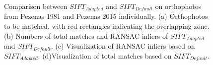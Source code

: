 \begin{figure}[htbp]
\begin{center}
{\begin{minipage}[t]{0.48\linewidth}
			\end{minipage}%
		}
		\caption{Comparison between $SIFT_{Adapted}$ and $SIFT_{Default}$ on orthophotos from Pezenas 1981 and Pezenas 2015 individually. (a) Orthophotos to be matched, with red rectangles indicating the overlapping zone. (b) Numbers of total matches and RANSAC inliers of $SIFT_{Adapted}$ and $SIFT_{Default}$. (c) Visualization of RANSAC inliers based on $SIFT_{Adapted}$. (d)Visualization of total matches based on $SIFT_{Default}$.}
		\label{SIFTComp_Ortho}
	\end{center}
\end{figure} 

